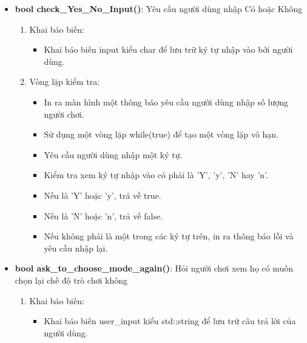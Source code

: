 \documentclass{article}
\begin{document}
\begin{itemize}
    \item \textbf{bool check\_Yes\_No\_Input()}: Yêu cầu người dùng nhập Có hoặc Không
    \begin{description}
            \begin{enumerate}
            \item Khai báo biến:
                \begin{itemize}
                    \item Khai báo biến input kiểu char để lưu trữ ký tự nhập vào bởi người dùng.
                \end{itemize}
            \item Vòng lặp kiểm tra:
                \begin{itemize}
                    \item In ra màn hình một thông báo yêu cầu người dùng nhập số lượng người chơi.
                    \item Sử dụng một vòng lặp while(true) để tạo một vòng lặp vô hạn.
                    \item Yêu cầu người dùng nhập một ký tự.
                    \item Kiểm tra xem ký tự nhập vào có phải là 'Y', 'y', 'N' hay 'n'.
                    \item Nếu là 'Y' hoặc 'y', trả về true.
                    \item Nếu là 'N' hoặc 'n', trả về false.
                    \item Nếu không phải là một trong các ký tự trên, in ra thông báo lỗi và yêu cầu nhập lại.
                \end{itemize} 
        \end{enumerate}
    \end{description}
    
    \item \textbf{bool ask\_to\_choose\_mode\_again()}: Hỏi người chơi xem họ có muốn chọn lại chế độ trò chơi không
    \begin{description}
            \begin{enumerate}
            \item Khai báo biến:
                \begin{itemize}
                    \item Khai báo biến user\_input kiểu std::string để lưu trữ câu trả lời của người dùng.


\end{itemize}
\end{enumerate}
\end{description}
\end{itemize}
\end{document}
